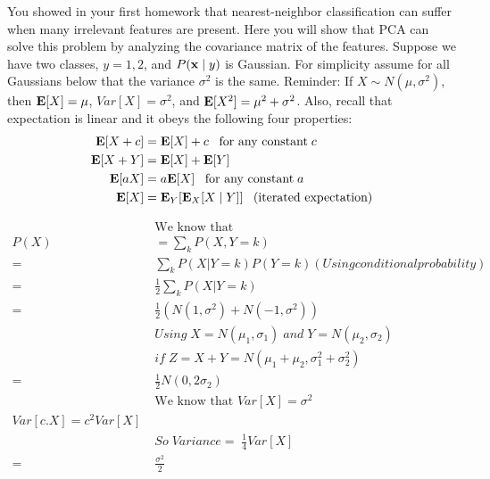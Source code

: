You showed in your first homework that nearest-neighbor classification
can suffer when many irrelevant features are present.  Here you will
show that PCA can solve this problem by analyzing the covariance
matrix of the features.  Suppose we have two classes, $y = 1, 2$, and
$P(\mathbf{x} \mid y)$ is Gaussian.  For simplicity assume for all Gaussians
below that the variance $\sigma^2$ is the same.  Reminder: If $X \sim
N(\mu,\sigma^2)$, then $\mathbf{E}[X] = \mu$, $Var[X] = \sigma^2$, and
$\mathbf{E}[X^2] = \mu^2 + \sigma^2$.  Also, recall that expectation is linear
and it obeys the following four properties:
\begin{align*}
\mathbf{E}[X + c] =&\; \mathbf{E}[X] + c\;\;\; \textrm{for any constant}\; c \\
\mathbf{E}[X + Y] =&\; \mathbf{E}[X] + \mathbf{E}[Y] \\
\mathbf{E}[aX] =&\; a\mathbf{E}[X]\;\;\; \textrm{for any constant}\; a \\
\mathbf{E}[X] =&\; \mathbf{E}_Y [ \mathbf{E}_X [X \mid Y] ] \;\;\; \textrm{(iterated expectation)}
\end{align*}

\begin{align*}
& \; \text{We know that }\\
P(X) &\; = \sum\limits_k P(X,Y=k) \\
 =&\; \sum \limits_k P(X | Y=k) P(Y=k)   (Using conditional probability)\\   
=&\; \frac{1}{2} \sum \limits_k P(X | Y=k) \\
=& \; \frac{1}{2} \left( N(1 , \sigma^2) + N (-1 , \sigma^2) \right) \\
&\; Using \; X = N (\mu_1 , \sigma_1) \; and \; Y =  N (\mu_2 , \sigma_2) \\
&\; if \; Z = X + Y = N (\mu_1 +\mu_2 , \sigma_1^2 + \sigma_2^2) \\
=&\; \frac{1}{2} N (0 , 2 \sigma_2) \\
&\; \text{We know that } Var[X] = \sigma^2 \\
Var[c.X] = c^2 Var[X] \\
&\; So \; Variance= \; \frac{1}{4} Var [X]\\
=&\; \frac{\sigma^2}{2} \\
\end{align*}


